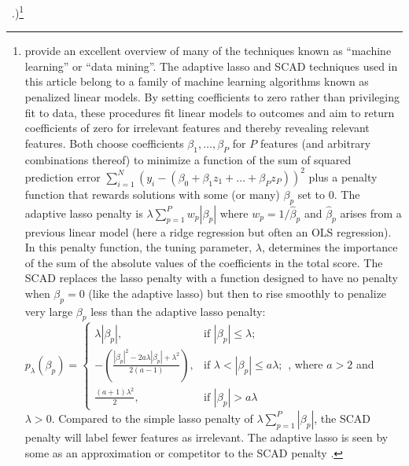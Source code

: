 \documentclass[12pt]{article}
\begin{document}
~\citep{hainmueller2012kernel}.)\footnote{\citet{hasttibfried09} provide an
  excellent overview of many of the techniques known as ``machine learning''
  or ``data mining''. The adaptive lasso and SCAD techniques used in this
  article belong to a family of machine learning algorithms known as penalized
  linear models. By setting coefficients to zero rather than privileging fit
  to data,  these procedures fit linear models to outcomes and aim to return
  coefficients of zero for irrelevant features and thereby revealing relevant
  features. Both choose coefficients $\beta_1, \ldots, \beta_P$ for $P$
  features (and arbitrary combinations thereof) to minimize a function of the
  sum of squared prediction error $\sum_{i=1}^N (y_i - ( \beta_0 + \beta_1 z_1
  + \ldots + \beta_P z_P) )^2$ plus a penalty function that rewards solutions
  with some (or many) $\beta_p$ set to 0. The adaptive lasso penalty is
  $\lambda \sum_{p=1}^P w_p|\beta_p|$ where $w_p=1/\hat{\beta}_p$ and
  $\hat{\beta}_p$ arises from a previous linear model (here a ridge regression
  but often an OLS regression). In this penalty function, the tuning
  parameter, $\lambda$, determines the importance of the sum of the absolute
  values of the coefficients in the total score. The SCAD replaces the lasso
  penalty with a function designed to have no penalty when $\beta_p=0$ (like
  the adaptive lasso) but then to rise smoothly to penalize very large
  $\beta_p$ less than the adaptive lasso penalty:
  $p_{\lambda}(\beta_p)=\begin{cases} \lambda |\beta_p|, & \text{if }
    |\beta_p|\le \lambda; \\ - \left( \frac{|\beta_p|^2 - 2 a \lambda
	|\beta_p| + \lambda^2}{2 (a-1)} \right), & \text{if } \lambda <
    |\beta_p| \le a \lambda; \\ \frac{(a+1)\lambda^2}{2},  & \text{if }
    |\beta_p| > a \lambda \end{cases}$, where $a > 2$ and $\lambda > 0$.
  Compared to the simple lasso penalty of $\lambda \sum_{p=1}^P |\beta_p|$,
  the SCAD penalty will label fewer features as irrelevant. The adaptive lasso
  is seen by some as an approximation or competitor to the SCAD penalty
  \cite[page 92]{hasttibfried09}. }
 
\end{document}
